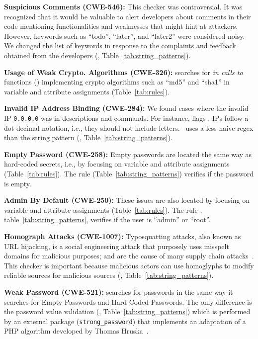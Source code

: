\textbf{Suspicious Comments (CWE-546):} This checker was controversial. It was 
recognized that it would be valuable to alert developers about comments in their code mentioning 
functionalities and weaknesses that might hint at attackers. However, keywords such 
as ``todo'', ``later'', and ``later2'' were considered noisy.  
We changed the list of keywords in response to the complaints and feedback 
obtained from the developers (, Table~\ref{tab:string_patterns}).

\textbf{Usage of Weak Crypto. Algorithms (CWE-326):} \toolname{}
searches for \emph{in calls to} functions () implementing 
crypto algorithms such as ``md5'' and ``sha1''
in variable and attribute assignments (Table~\ref{tab:rules}). 

\textbf{Invalid IP Address Binding (CWE-284):} We found cases where 
the invalid IP \texttt{0.0.0.0} was in descriptions and commands. 
For instance, \slic{} flags . IPs follow a 
dot-decimal notation, i.e., they should not include letters. 
\toolname\ uses a less naive regex 
than the string pattern 
(, Table~\ref{tab:string_patterns}).

\textbf{Empty Password (CWE-258):} Empty passwords 
are located the same way as hard-coded secrets, i.e., 
by focusing on variable and attribute assignments (Table~\ref{tab:rules}).
The rule  (Table~\ref{tab:string_patterns}) verifies 
if the password is empty. 

\textbf{Admin By Default (CWE-250):} These issues 
are also located by focusing on variable and attribute 
assignments (Table~\ref{tab:rules}). The rule , table~\ref{tab:string_patterns}, verifies 
if the user is ``admin'' or ``root''.


\textbf{Homograph Attacks (CWE-1007):} Typosquatting
attacks, also known as URL hijacking, is a social engineering attack 
that purposely uses misspelt domains for malicious purposes;
and are the cause of many supply chain attacks~\cite{duan2020measuring}.
This checker is important because malicious actors 
can use homoglyphs to modify reliable sources 
for malicious sources (, Table~\ref{tab:string_patterns}).


\textbf{Weak Password (CWE-521):} \toolname{} searches 
for passwords in the same way it searches for Empty Passwords and Hard-Coded 
Passwords. The only difference is the password value validation (, Table~\ref{tab:string_patterns})
which is performed by an external package (\texttt{strong\_password})
that implements an adaptation of a PHP algorithm developed by Thomas Hruska~\cite{blogpost}.

